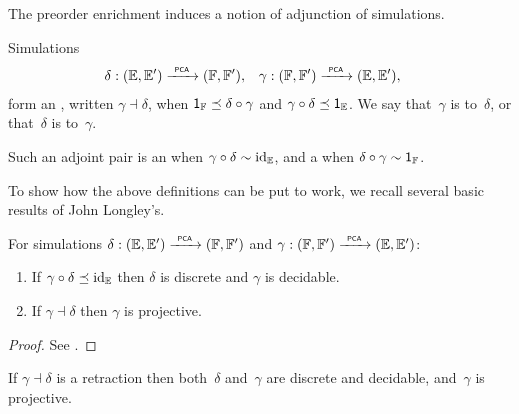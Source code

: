 The preorder enrichment induces a notion of adjunction of simulations.

\begin{definition}
  Simulations
  \begin{align*}
    \delta &: (\EE, \subEE) \pcato (\FF, \subFF),
    &
    \gamma &: (\FF, \subFF) \pcato (\EE, \subEE),
  \end{align*}
  form an , written $\gamma \dashv \delta$, when
  $\one_{\FF} \preceq \delta \circ \gamma$ and $\gamma \circ
  \delta \preceq \one_{\EE}$. We say that~$\gamma$ is  to~$\delta$, or that~$\delta$ is 
  to~$\gamma$.

  Such an adjoint pair is an  when $\gamma \circ \delta \sim \id[\EE]$, and a
   when $\delta \circ \gamma \sim \one_\FF$.
\end{definition}

To show how the above definitions can be put to work, we recall several basic results of John Longley's.

\begin{theorem}
  \label{th:simulation-properties2}%
  For simulations $\delta: (\EE, \subEE) \pcato (\FF, \subFF)$ and
  $\gamma: (\FF, \subFF) \pcato (\EE, \subEE)$:
  \begin{enumerate}
  \item
    If $\gamma \circ \delta \preceq \id[\EE]$ then $\delta$ is discrete 
    and $\gamma$ is decidable.
  \item
    If $\gamma \dashv \delta$ then $\gamma$ is projective.
  \end{enumerate}
\end{theorem}

\begin{proof}
  See \cite[Theorem 2.5.3]{Longley:94}.
\end{proof}

\begin{corollary}
  \label{th:simulation-properties}%
  If $\gamma \dashv \delta$ is a retraction then both~$\delta$
  and~$\gamma$ are discrete and decidable, and~$\gamma$ is projective.
\end{corollary}

